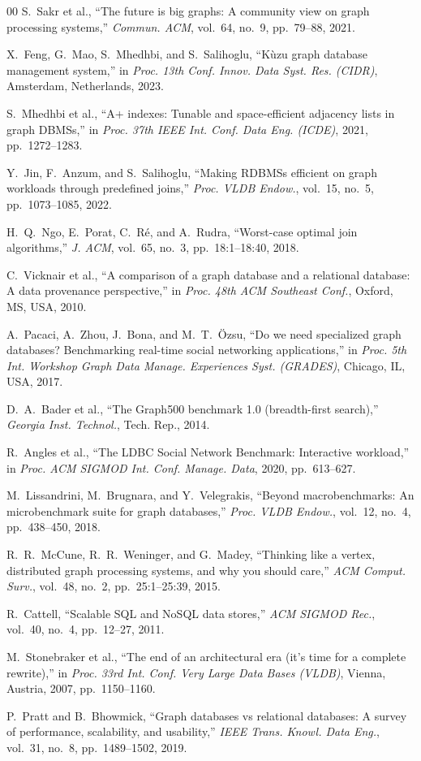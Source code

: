 \documentclass[conference,10pt]{IEEEtran}%
\begin{document}
\begin{thebibliography}{00}
S.~Sakr et al., ``The future is big graphs: A community view on graph processing systems,'' \emph{Commun. ACM}, vol.~64, no.~9, pp.~79--88, 2021.

X.~Feng, G.~Mao, S.~Mhedhbi, and S.~Salihoglu, ``K{\`u}zu graph database management system,'' in \emph{Proc. 13th Conf. Innov. Data Syst. Res. (CIDR)}, Amsterdam, Netherlands, 2023.

S.~Mhedhbi et al., ``A+ indexes: Tunable and space-efficient adjacency lists in graph DBMSs,'' in \emph{Proc. 37th IEEE Int. Conf. Data Eng. (ICDE)}, 2021, pp.~1272--1283.

Y.~Jin, F.~Anzum, and S.~Salihoglu, ``Making RDBMSs efficient on graph workloads through predefined joins,'' \emph{Proc. VLDB Endow.}, vol.~15, no.~5, pp.~1073--1085, 2022.

H.~Q.~Ngo, E.~Porat, C.~R{\'e}, and A.~Rudra, ``Worst-case optimal join algorithms,'' \emph{J. ACM}, vol.~65, no.~3, pp.~18:1--18:40, 2018.

C.~Vicknair et al., ``A comparison of a graph database and a relational database: A data provenance perspective,'' in \emph{Proc. 48th ACM Southeast Conf.}, Oxford, MS, USA, 2010.

A.~Pacaci, A.~Zhou, J.~Bona, and M.~T.~{\"O}zsu, ``Do we need specialized graph databases? Benchmarking real-time social networking applications,'' in \emph{Proc. 5th Int. Workshop Graph Data Manage. Experiences Syst. (GRADES)}, Chicago, IL, USA, 2017.

D.~A.~Bader et al., ``The Graph500 benchmark 1.0 (breadth-first search),'' \emph{Georgia Inst. Technol.}, Tech. Rep., 2014.

R.~Angles et al., ``The LDBC Social Network Benchmark: Interactive workload,'' in \emph{Proc. ACM SIGMOD Int. Conf. Manage. Data}, 2020, pp.~613--627.

M.~Lissandrini, M.~Brugnara, and Y.~Velegrakis, ``Beyond macrobenchmarks: An microbenchmark suite for graph databases,'' \emph{Proc. VLDB Endow.}, vol.~12, no.~4, pp.~438--450, 2018.

R.~R.~McCune, R.~R.~Weninger, and G.~Madey, ``Thinking like a vertex, distributed graph processing systems, and why you should care,'' \emph{ACM Comput. Surv.}, vol.~48, no.~2, pp.~25:1--25:39, 2015.

R.~Cattell, ``Scalable SQL and NoSQL data stores,'' \emph{ACM SIGMOD Rec.}, vol.~40, no.~4, pp.~12--27, 2011.

M.~Stonebraker et al., ``The end of an architectural era (it's time for a complete rewrite),'' in \emph{Proc. 33rd Int. Conf. Very Large Data Bases (VLDB)}, Vienna, Austria, 2007, pp.~1150--1160.

P.~Pratt and B.~Bhowmick, ``Graph databases vs relational databases: A survey of performance, scalability, and usability,'' \emph{IEEE Trans. Knowl. Data Eng.}, vol.~31, no.~8, pp.~1489--1502, 2019.

\end{thebibliography}
\end{document}
